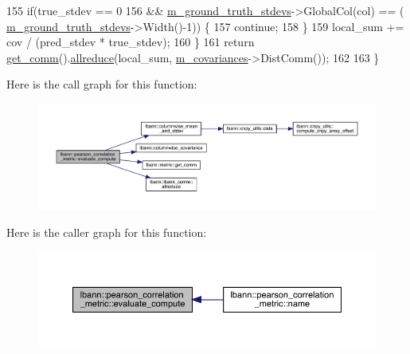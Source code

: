 \begin{DoxyCode}
155     \textcolor{keywordflow}{if}(true\_stdev == 0
156        && \hyperlink{classlbann_1_1pearson__correlation__metric_a7ed5e7a1778d17f852f4277afcaa31ed}{m\_ground\_truth\_stdevs}->GlobalCol(col) == (
      \hyperlink{classlbann_1_1pearson__correlation__metric_a7ed5e7a1778d17f852f4277afcaa31ed}{m\_ground\_truth\_stdevs}->Width()-1)) \{
157       \textcolor{keywordflow}{continue};
158     \}
159     local\_sum += cov / (pred\_stdev * true\_stdev);
160   \}
161   \textcolor{keywordflow}{return} \hyperlink{classlbann_1_1metric_a464120720df6bfdf91bffe353e562964}{get\_comm}().\hyperlink{classlbann_1_1lbann__comm_af5631e5f0f54e4df4958eba9df2599ef}{allreduce}(local\_sum, \hyperlink{classlbann_1_1pearson__correlation__metric_aeabb941e22f2718a59103b7ec98a9c1e}{m\_covariances}->DistComm());
162 
163 \}
\end{DoxyCode}
Here is the call graph for this function\+:\nopagebreak
\begin{figure}[H]
\begin{center}
\leavevmode
\includegraphics[width=350pt]{classlbann_1_1pearson__correlation__metric_a28453718aa09d609ef5ab157823d8c24_cgraph}
\end{center}
\end{figure}
Here is the caller graph for this function\+:\nopagebreak
\begin{figure}[H]
\begin{center}
\leavevmode
\includegraphics[width=350pt]{classlbann_1_1pearson__correlation__metric_a28453718aa09d609ef5ab157823d8c24_icgraph}
\end{center}
\end{figure}
\mbox{\label{classlbann_1_1pearson__correlation__metric_a7cbb12e258acdb0cbc4d521dc7163dd6}} 
